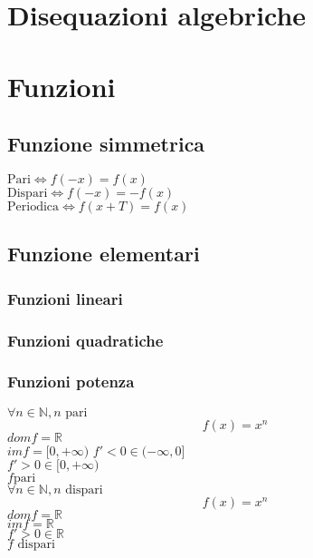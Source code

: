 \documentclass[a4paper,12pt]{article}
\theoremstyle{mystyle}
\begin{document}
\section{Disequazioni algebriche}

\section{Funzioni}

\subsection{Funzione simmetrica}
\(\text{Pari}\Leftrightarrow f(-x)=f(x)\)\\
\(\text{Dispari}\Leftrightarrow f(-x)=-f(x)\)\\
\(\text{Periodica}\Leftrightarrow f(x+T)=f(x)\)

\subsection{Funzione elementari}
\subsubsection{Funzioni lineari}

\subsubsection{Funzioni quadratiche}

\subsubsection{Funzioni potenza}
\(\forall n \in \mathbb N , n \text{ pari}\)\\
\begin{equation}
    f(x)=x^n
\end{equation}
\(dom f = \mathbb R\)\\
\(im f = [0, + \infty)\)
\(f'<0 \in (- \infty, 0]\)\\
\(f'>0 \in [0, + \infty)\)\\
\(f \text{pari}\)\\

\(\forall n \in \mathbb N, n \text{ dispari}\)\\
\begin{equation}
    f(x)=x^n
\end{equation}
\(dom f = \mathbb R\)\\
\(im f = \mathbb R\)\\
\(f'>0 \in \mathbb R\)\\
\(f \text{ dispari}\)\\
\end{document}

